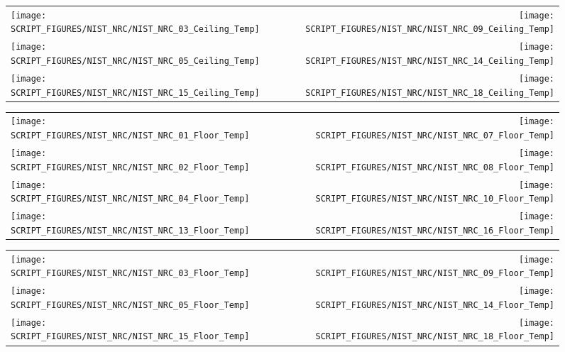 \begin{figure}[!ht]
\begin{tabular*}{\textwidth}{l@{\extracolsep{\fill}}r}
\texttt{[image: SCRIPT\_FIGURES/NIST\_NRC/NIST\_NRC\_03\_Ceiling\_Temp]} &
\texttt{[image: SCRIPT\_FIGURES/NIST\_NRC/NIST\_NRC\_09\_Ceiling\_Temp]} \\
\texttt{[image: SCRIPT\_FIGURES/NIST\_NRC/NIST\_NRC\_05\_Ceiling\_Temp]} &
\texttt{[image: SCRIPT\_FIGURES/NIST\_NRC/NIST\_NRC\_14\_Ceiling\_Temp]} \\
\texttt{[image: SCRIPT\_FIGURES/NIST\_NRC/NIST\_NRC\_15\_Ceiling\_Temp]} &
\texttt{[image: SCRIPT\_FIGURES/NIST\_NRC/NIST\_NRC\_18\_Ceiling\_Temp]}
\end{tabular*}
\label{NIST_NRC_Ceiling_Temp_Open}
\end{figure}

\begin{figure}[!ht]
\begin{tabular*}{\textwidth}{l@{\extracolsep{\fill}}r}
\texttt{[image: SCRIPT\_FIGURES/NIST\_NRC/NIST\_NRC\_01\_Floor\_Temp]} &
\texttt{[image: SCRIPT\_FIGURES/NIST\_NRC/NIST\_NRC\_07\_Floor\_Temp]} \\
\texttt{[image: SCRIPT\_FIGURES/NIST\_NRC/NIST\_NRC\_02\_Floor\_Temp]} &
\texttt{[image: SCRIPT\_FIGURES/NIST\_NRC/NIST\_NRC\_08\_Floor\_Temp]} \\
\texttt{[image: SCRIPT\_FIGURES/NIST\_NRC/NIST\_NRC\_04\_Floor\_Temp]} &
\texttt{[image: SCRIPT\_FIGURES/NIST\_NRC/NIST\_NRC\_10\_Floor\_Temp]} \\
\texttt{[image: SCRIPT\_FIGURES/NIST\_NRC/NIST\_NRC\_13\_Floor\_Temp]} &
\texttt{[image: SCRIPT\_FIGURES/NIST\_NRC/NIST\_NRC\_16\_Floor\_Temp]}
\end{tabular*}
\label{NIST_NRC_Floor_Temp_Closed}
\end{figure}

\begin{figure}[!ht]
\begin{tabular*}{\textwidth}{l@{\extracolsep{\fill}}r}
\texttt{[image: SCRIPT\_FIGURES/NIST\_NRC/NIST\_NRC\_03\_Floor\_Temp]} &
\texttt{[image: SCRIPT\_FIGURES/NIST\_NRC/NIST\_NRC\_09\_Floor\_Temp]} \\
\texttt{[image: SCRIPT\_FIGURES/NIST\_NRC/NIST\_NRC\_05\_Floor\_Temp]} &
\texttt{[image: SCRIPT\_FIGURES/NIST\_NRC/NIST\_NRC\_14\_Floor\_Temp]} \\
\texttt{[image: SCRIPT\_FIGURES/NIST\_NRC/NIST\_NRC\_15\_Floor\_Temp]} &
\texttt{[image: SCRIPT\_FIGURES/NIST\_NRC/NIST\_NRC\_18\_Floor\_Temp]}
\end{tabular*}
\label{NIST_NRC_Floor_Temp_Open}
\end{figure}

